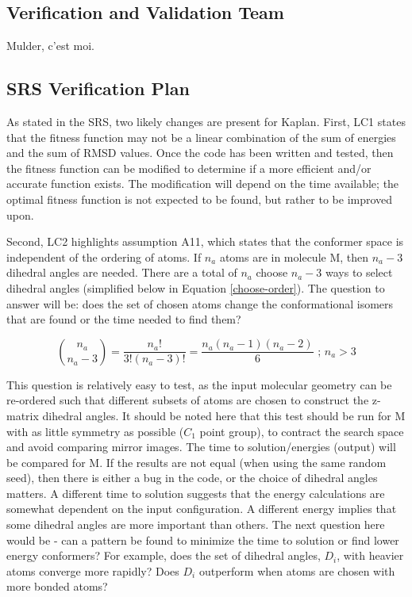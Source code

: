 \documentclass[12pt, titlepage]{article}
\newcommand{\progname}{Kaplan} %
\begin{document}
\subsection{Verification and Validation Team}

Mulder, c'est moi.


\subsection{SRS Verification Plan}

As stated in the SRS, two likely changes are present for \progname{}. First, 
LC1 states that the fitness function may not be a linear combination of the sum 
of energies and the sum of RMSD values. Once the code has been written and 
tested, then the fitness function can be modified to determine if a more 
efficient and/or accurate function exists. The modification will depend on the 
time available; the optimal fitness function is not expected to be found, but 
rather to be improved upon.

Second, LC2 highlights assumption A11, which states that the conformer space is 
independent of the ordering of atoms. If $n_a$ atoms are in molecule M, then 
$n_a-3$ dihedral angles are needed. There are a total of $n_a$ choose $n_a-3$ 
ways to select dihedral angles (simplified below in Equation 
\ref{choose-order}). The question to answer will be: does the set of chosen 
atoms change the conformational isomers that are found or the time needed to 
find them?

\begin{equation} \label{choose-order}
\binom{n_a}{n_a-3} = \frac{n_a!}{3!(n_a-3)!} = \frac{n_a(n_a-1)(n_a-2)}{6} 
\text{ ; } n_a > 3
\end{equation}

This question is relatively easy to test, as the input molecular geometry can 
be re-ordered such that different subsets of atoms are chosen to construct the 
z-matrix dihedral angles. It should be noted here that this test should be run 
for M with as little symmetry as possible ($C_1$ point group), to contract the 
search space and avoid comparing mirror images. The time to solution/energies 
(output) will be compared for M. If the results are not equal (when using the 
same random seed), then there is either a bug in the code, or the choice of 
dihedral angles matters. A different time to solution suggests that the energy 
calculations are somewhat dependent on the input configuration. A different 
energy implies that some dihedral angles are more important than others. The 
next question here would be - can a pattern be found to minimize the time to 
solution or find lower energy conformers? For example, does the set of dihedral 
angles, $D_i$, with heavier atoms converge more rapidly? Does $D_i$ outperform 
when atoms are chosen with more bonded atoms?
\end{document}

